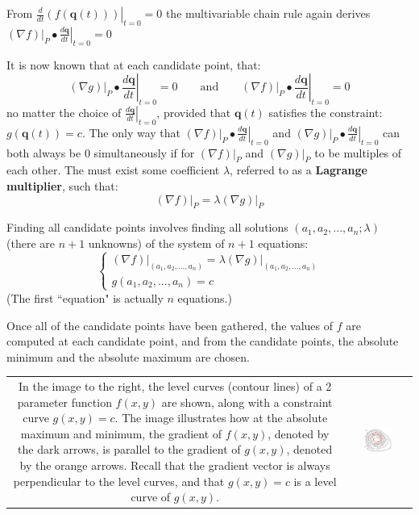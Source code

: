 \documentclass{article}
\begin{document}
From \(\left.\frac{d}{dt}(f(\mathbf{q}(t)))\right|_{t = 0} = 0\) the multivariable chain rule again derives \((\nabla f)\Big|_{P} \bullet \left.\frac{d\mathbf{q}}{dt}\right|_{t = 0} = 0\)

It is now known that at each candidate point, that: 
\[(\nabla g)\Big|_{P} \bullet \left.\frac{d\mathbf{q}}{dt}\right|_{t = 0} = 0 \quad\quad\text{and}\quad\quad (\nabla f)\Big|_{P} \bullet \left.\frac{d\mathbf{q}}{dt}\right|_{t = 0} = 0\]
no matter the choice of \(\left.\frac{d\mathbf{q}}{dt}\right|_{t = 0}\), provided that \(\mathbf{q}(t)\) satisfies the constraint: \(g(\mathbf{q}(t)) = c\). The only way that \((\nabla f)\Big|_{P} \bullet \left.\frac{d\mathbf{q}}{dt}\right|_{t = 0}\) and \((\nabla g)\Big|_{P} \bullet \left.\frac{d\mathbf{q}}{dt}\right|_{t = 0}\) can both always be \(0\) simultaneously if for \((\nabla f)\Big|_{P}\) and \((\nabla g)\Big|_{P}\) to be multiples of each other. The must exist some coefficient \(\lambda\), referred to as a {\bf Lagrange multiplier}, such that:
\[(\nabla f)\Big|_{P} = \lambda (\nabla g)\Big|_{P}\]

Finding all candidate points involves finding all solutions \((a_1, a_2, ..., a_n; \lambda)\) (there are \(n+ 1\) unknowns) of the system of \(n + 1\) equations:
\[\left\{\begin{array}{c}
(\nabla f)\Big|_{(a_1, a_2, ..., a_n)} = \lambda (\nabla g)\Big|_{(a_1, a_2, ..., a_n)} \\ 
g(a_1, a_2, ..., a_n) = c
\end{array}\right.\]
(The first ``equation" is actually \(n\) equations.)

Once all of the candidate points have been gathered, the values of \(f\) are computed at each candidate point, and from the candidate points, the absolute minimum and the absolute maximum are chosen.

\begin{tabular}{cc}
\parbox{0.5\textwidth}{
In the image to the right, the level curves (contour lines) of a 2 parameter function \(f(x,y)\) are shown, along with a constraint curve \(g(x,y) = c\). The image illustrates how at the absolute maximum and minimum, the gradient of \(f(x,y)\), denoted by the dark arrows, is parallel to the gradient of \(g(x,y)\), denoted by the orange arrows. Recall that the gradient vector is always perpendicular to the level curves, and that \(g(x,y) = c\) is a level curve of \(g(x,y)\).
} & \parbox{0.5\textwidth}{
\includegraphics[width = 0.5\textwidth]{level_curves_and_Lagrange_multipliers}
}
\end{tabular}
\end{document}
